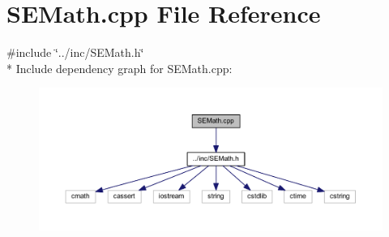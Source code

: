 \section{S\+E\+Math.\+cpp File Reference}
\label{_s_e_math_8cpp}
{\ttfamily \#include \char`\"{}../inc/\+S\+E\+Math.\+h\char`\"{}}\\*
Include dependency graph for S\+E\+Math.\+cpp\+:
\nopagebreak
\begin{figure}[H]
\begin{center}
\leavevmode
\includegraphics[width=350pt]{_s_e_math_8cpp__incl}
\end{center}
\end{figure}
